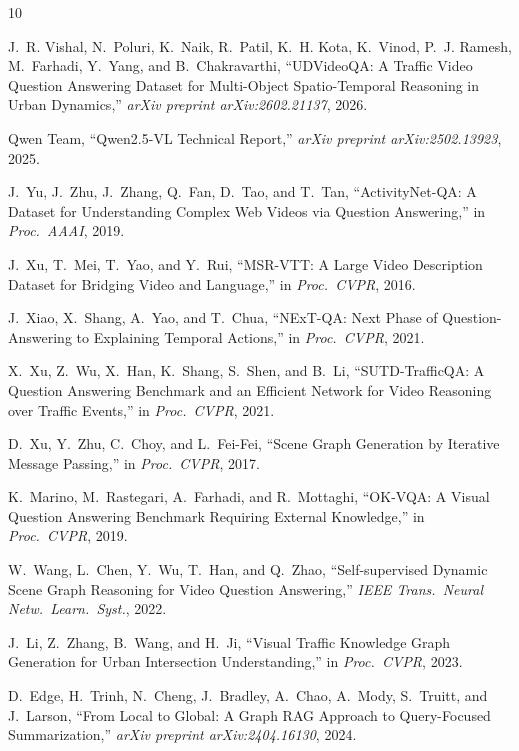 \documentclass[10pt,conference,compsoc]{IEEEtran}
\begin{document}
\begin{thebibliography}{10}

J.~R. Vishal, N.~Poluri, K.~Naik, R.~Patil, K.~H. Kota,
K.~Vinod, P.~J. Ramesh, M.~Farhadi, Y.~Yang, and
B.~Chakravarthi,
``{UDVideoQA}: A Traffic Video Question Answering Dataset for
Multi-Object Spatio-Temporal Reasoning in Urban Dynamics,''
\textit{arXiv preprint arXiv:2602.21137}, 2026.

Qwen Team,
``Qwen2.5-VL Technical Report,''
\textit{arXiv preprint arXiv:2502.13923}, 2025.

J.~Yu, J.~Zhu, J.~Zhang, Q.~Fan, D.~Tao, and T.~Tan,
``ActivityNet-QA: A Dataset for Understanding Complex Web Videos
via Question Answering,''
in \textit{Proc.\ AAAI}, 2019.

J.~Xu, T.~Mei, T.~Yao, and Y.~Rui,
``MSR-VTT: A Large Video Description Dataset for Bridging Video
and Language,''
in \textit{Proc.\ CVPR}, 2016.

J.~Xiao, X.~Shang, A.~Yao, and T.~Chua,
``NExT-QA: Next Phase of Question-Answering to Explaining
Temporal Actions,''
in \textit{Proc.\ CVPR}, 2021.

X.~Xu, Z.~Wu, X.~Han, K.~Shang, S.~Shen, and B.~Li,
``SUTD-TrafficQA: A Question Answering Benchmark and an Efficient
Network for Video Reasoning over Traffic Events,''
in \textit{Proc.\ CVPR}, 2021.

D.~Xu, Y.~Zhu, C.~Choy, and L.~Fei-Fei,
``Scene Graph Generation by Iterative Message Passing,''
in \textit{Proc.\ CVPR}, 2017.

K.~Marino, M.~Rastegari, A.~Farhadi, and R.~Mottaghi,
``OK-VQA: A Visual Question Answering Benchmark Requiring
External Knowledge,''
in \textit{Proc.\ CVPR}, 2019.

W.~Wang, L.~Chen, Y.~Wu, T.~Han, and Q.~Zhao,
``Self-supervised Dynamic Scene Graph Reasoning for Video
Question Answering,''
\textit{IEEE Trans.\ Neural Netw.\ Learn.\ Syst.}, 2022.

J.~Li, Z.~Zhang, B.~Wang, and H.~Ji,
``Visual Traffic Knowledge Graph Generation for Urban
Intersection Understanding,''
in \textit{Proc.\ CVPR}, 2023.

D.~Edge, H.~Trinh, N.~Cheng, J.~Bradley, A.~Chao,
A.~Mody, S.~Truitt, and J.~Larson,
``From Local to Global: A Graph RAG Approach to Query-Focused
Summarization,''
\textit{arXiv preprint arXiv:2404.16130}, 2024.


\end{thebibliography}
\end{document}
